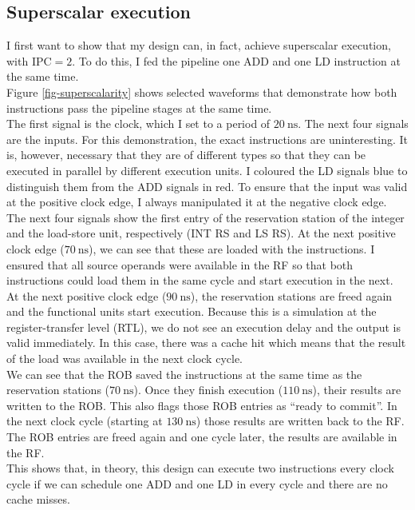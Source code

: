 \documentclass[12pt,a4paper]{article} %
\begin{document}
\newpage
\subsection{Superscalar execution}
I first want to show that my design can, in fact, achieve superscalar execution, with $\text{IPC} = 2$. To do this, I fed the pipeline one ADD and one LD instruction at the same time. \\

Figure \ref{fig-superscalarity} shows selected waveforms that demonstrate how both instructions pass the pipeline stages at the same time. \\
The first signal is the clock, which I set to a period of $\SI{20}{\ns}$. The next four signals are the inputs. For this demonstration, the exact instructions are uninteresting. It is, however, necessary that they are of different types so that they can be executed in parallel by different execution units. I coloured the LD signals blue to distinguish them from the ADD signals in red. To ensure that the input was valid at the positive clock edge, I always manipulated it at the negative clock edge.\\
The next four signals show the first entry of the reservation station of the integer and the load-store unit, respectively (INT RS and LS RS). At the next positive clock edge ($\SI{70}{\ns}$), we can see that these are loaded with the instructions. I ensured that all source operands were available in the RF so that both instructions could load them in the same cycle and start execution in the next. \\
At the next positive clock edge ($\SI{90}{\ns}$), the reservation stations are freed again and the functional units start execution. Because this is a simulation at the register-transfer level (RTL), we do not see an execution delay and the output is valid immediately. In this case, there was a cache hit which means that the result of the load was available in the next clock cycle.\\
We can see that the ROB saved the instructions at the same time as the reservation stations ($\SI{70}{\ns}$). Once they finish execution ($\SI{110}{\ns}$), their results are written to the ROB. This also flags those ROB entries as ``ready to commit''. In the next clock cycle (starting at $\SI{130}{\ns}$) those results are written back to the RF. The ROB entries are freed again and one cycle later, the results are available in the RF. \\

This shows that, in theory, this design can execute two instructions every clock cycle if we can schedule one ADD and one LD in every cycle and there are no cache misses.
\end{document}
